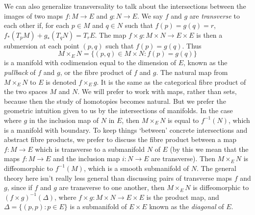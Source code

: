 \begin{comment}
In many respects, we should expect `generic' submanifolds to intersect transversally.

\begin{example}
    Two subspaces $V,W \subset \RR^d$ intersect transversally precisely when $V + W = \RR^d$. Fix $n,m < d$ with $n + m \geq d$, and consider
    \[ \Sigma = \{ (V,W) \in G(n,d) \times G(m,d) : V + W \neq \RR^d \}. \]
    If we identify $G(n,d) \times G(m,d)$ with a quotient of
    \[ \{ (v,w) \in (\RR^d)^n \times (\RR^d)^m : (v_1, \dots, v_n)\ \text{and}\ (w_1, \dots, w_m)\ \text{are linearly independent} \}, \]
    We can write $\Sigma$ as the set of all $[v,w]$ such that for each $i_1, \dots, i_\alpha \in \{ 1, \dots, n \}$ and $j_1, \dots, j_{d-\alpha} \in \{ 1, \dots, m \}$,
    \[ v_{i_1} \wedge \dots \wedge v_{i_\alpha} \wedge w_{j_1} \wedge \dots \wedge w_{j_{d-\alpha}} = 0. \]
    Thus $\Sigma$ is a proper projective subvariety of $GL(n) \times GL(m)$, which means that for a `algebraically generic' pair $(V,W) \in GL(n,d) \times GL(m,d)$, $V + W = \RR^d$.
\end{example}
\end{comment}

We can also generalize transversality to talk about the intersections between the images of two maps $f: M \to E$ and $g: N \to E$. We say $f$ and $g$ are \emph{transverse} to each other if, for each $p \in M$ and $q \in N$ such that $f(p) = g(q) = r$, $f_*(T_p M) + g_*(T_q N) = T_r E$. The map $f \times g : M \times N \to E \times E$ is then a submersion at each point $(p,q)$ such that $f(p) = g(q)$. Thus
%
\[ M \times_E N = \{ (p,q) \in M \times N : f(p) = g(q) \} \]
%
is a manifold with codimension equal to the dimension of $E$, known as the \emph{pullback} of $f$ and $g$, or the fibre product of $f$ and $g$. The natural map from $M \times_E N$ to $E$ is denoted $f \times_E g$. It is the same as the categorical fibre product of the two spaces $M$ and $N$. We will prefer to work with maps, rather than sets, because then the study of homotopies becomes natural. But we prefer the geometric intuition given to us by the intersections of manifolds. In the case where $g$ in the inclusion map of $N$ in $E$, then $M \times_E N$ is equal to $f^{-1}(N)$, which is a manifold with boundary. To keep things `between' concrete intersections and abstract fibre products, we prefer to discuss the fibre product between a map $f: M \to E$ which is transverse to a submanifold $N$ of $E$ (by this we mean that the maps $f: M \to E$ and the inclusion map $i: N \to E$ are transverse). Then $M \times_E N$ is diffeomorphic to $f^{-1}(M)$, which is a smooth submanifold of $N$. The general theory here isn't really less general than discussing pairs of transverse maps $f$ and $g$, since if $f$ and $g$ are transverse to one another, then $M \times_E N$ is diffeomorphic to $(f \times g)^{-1}(\Delta)$, where $f \times g: M \times N \to E \times E$ is the product map, and $\Delta = \{ (p,p): p \in E \}$ is a submanifold of $E \times E$ known as the \emph{diagonal} of $E$.

